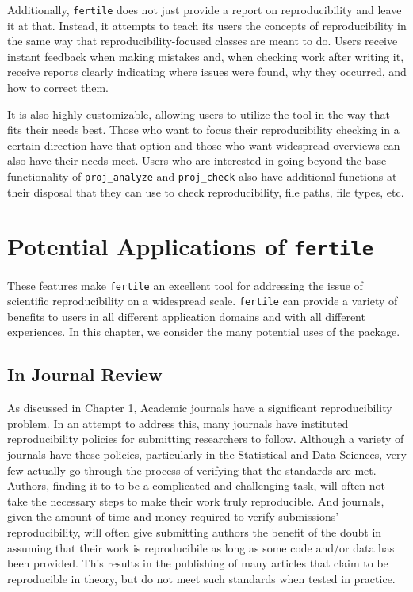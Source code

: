 \documentclass[12pt,twoside]{reedthesis}
\begin{document}
Additionally, \texttt{fertile} does not just provide a report on
reproducibility and leave it at that. Instead, it attempts to teach its
users the concepts of reproducibility in the same way that
reproducibility-focused classes are meant to do. Users receive instant
feedback when making mistakes and, when checking work after writing it,
receive reports clearly indicating where issues were found, why they
occurred, and how to correct them.

It is also highly customizable, allowing users to utilize the tool in
the way that fits their needs best. Those who want to focus their
reproducibility checking in a certain direction have that option and
those who want widespread overviews can also have their needs meet.
Users who are interested in going beyond the base functionality of
\texttt{proj\_analyze} and \texttt{proj\_check} also have additional
functions at their disposal that they can use to check reproducibility,
file paths, file types, etc.

\section{\texorpdfstring{Potential Applications of
\texttt{fertile}}{Potential Applications of fertile}}\label{potential-applications-of-fertile}

These features make \texttt{fertile} an excellent tool for addressing
the issue of scientific reproducibility on a widespread scale.
\texttt{fertile} can provide a variety of benefits to users in all
different application domains and with all different experiences. In
this chapter, we consider the many potential uses of the package.

\subsection{In Journal Review}\label{in-journal-review}

As discussed in Chapter 1, Academic journals have a significant
reproducibility problem. In an attempt to address this, many journals
have instituted reproducibility policies for submitting researchers to
follow. Although a variety of journals have these policies, particularly
in the Statistical and Data Sciences, very few actually go through the
process of verifying that the standards are met. Authors, finding it to
to be a complicated and challenging task, will often not take the
necessary steps to make their work truly reproducible. And journals,
given the amount of time and money required to verify submissions'
reproducibility, will often give submitting authors the benefit of the
doubt in assuming that their work is reproducibile as long as some code
and/or data has been provided. This results in the publishing of many
articles that claim to be reproducible in theory, but do not meet such
standards when tested in practice.
\end{document}
